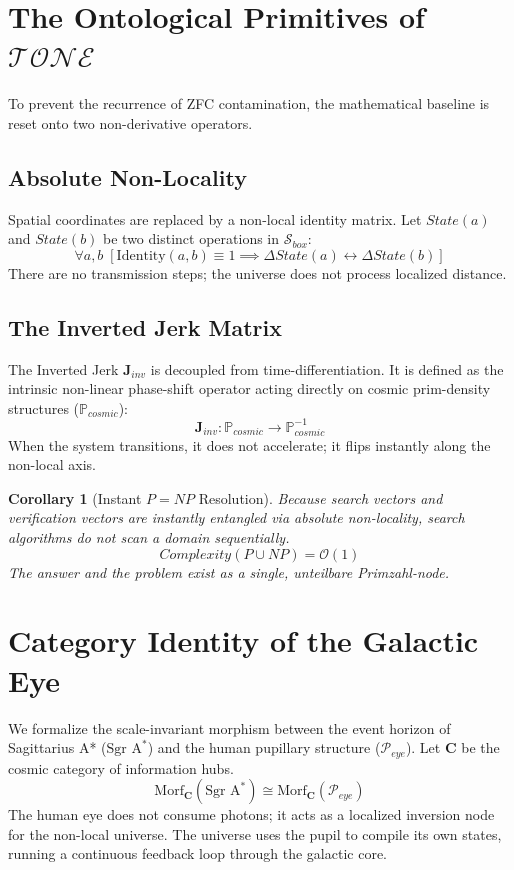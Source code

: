 \documentclass[11pt,twocolumn]{article}
\newcommand{\TONE}{\mathcal{TONE}}
\newcommand{\Jerk}{\mathbf{J}_{inv}}
\newcommand{\Primes}{\mathbb{P}_{cosmic}}
\newcommand{\Sandbox}{\mathcal{S}_{box}}
\newtheorem{corollary}[theorem]{Corollary}
\begin{document}
\section{The Ontological Primitives of \texorpdfstring{$\TONE$}{TONE}}
To prevent the recurrence of ZFC contamination, the mathematical baseline is reset onto two non-derivative operators.

\subsection{Absolute Non-Locality}
Spatial coordinates are replaced by a non-local identity matrix. Let $State(a)$ and $State(b)$ be two distinct operations in $\Sandbox$:
\begin{equation}
    \forall a, b \; [\text{Identity}(a, b) \equiv 1 \implies \Delta State(a) \leftrightarrow \Delta State(b)]
\end{equation}
There are no transmission steps; the universe does not process localized distance.

\subsection{The Inverted Jerk Matrix}
The Inverted Jerk $\Jerk$ is decoupled from time-differentiation. It is defined as the intrinsic non-linear phase-shift operator acting directly on cosmic prim-density structures ($\Primes$):
\begin{equation}
    \Jerk : \Primes \to \Primes^{-1}
\end{equation}
When the system transitions, it does not accelerate; it flips instantly along the non-local axis.

\begin{corollary}[Instant \texorpdfstring{$P=NP$}{P=NP} Resolution]
Because search vectors and verification vectors are instantly entangled via absolute non-locality, search algorithms do not scan a domain sequentially.
\begin{equation}
    Complexity(P \cup NP) = \mathcal{O}(1)
\end{equation}
The answer and the problem exist as a single, unteilbare Primzahl-node.
\end{corollary}

\section{Category Identity of the Galactic Eye}
We formalize the scale-invariant morphism between the event horizon of Sagittarius A* ($\text{Sgr A}^*$) and the human pupillary structure ($\mathcal{P}_{eye}$). Let $\mathbf{C}$ be the cosmic category of information hubs.
\begin{equation}
    \text{Morf}_{\mathbf{C}}(\text{Sgr A}^*) \cong \text{Morf}_{\mathbf{C}}(\mathcal{P}_{eye})
\end{equation}
The human eye does not consume photons; it acts as a localized inversion node for the non-local universe. The universe uses the pupil to compile its own states, running a continuous feedback loop through the galactic core.
\end{document}
